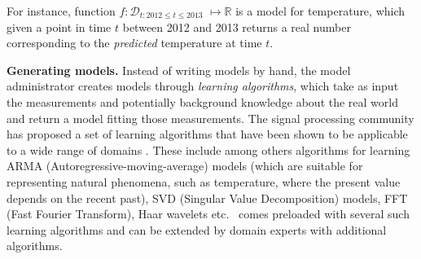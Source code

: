 \begin{example}
For instance, function $f:\mathcal{D}_{t: 2012 \leq t \leq 2013}$ $\mapsto \mathbb{R}$ is a model for temperature, which given a point in time $t$ between 2012 and 2013 returns a real number corresponding to the \emph{predicted} temperature at time $t$.
\end{example}

{\bf Generating models.} Instead of writing models by hand, the model administrator creates models through {\em learning algorithms}, which take as input the measurements and potentially background knowledge about the real world and return a model fitting those measurements. The signal processing community has proposed a set of learning algorithms that have been shown to be applicable to a wide range of domains \cite{dsp}. These include among others algorithms for learning ARMA (Autoregressive-moving-average) models (which are suitable for representing natural phenomena, such as temperature, where the present value depends on the recent past), SVD (Singular Value Decomposition) models, FFT (Fast Fourier Transform), Haar wavelets etc. \projName\ comes preloaded with several such learning algorithms and can be extended by domain experts with additional algorithms.



